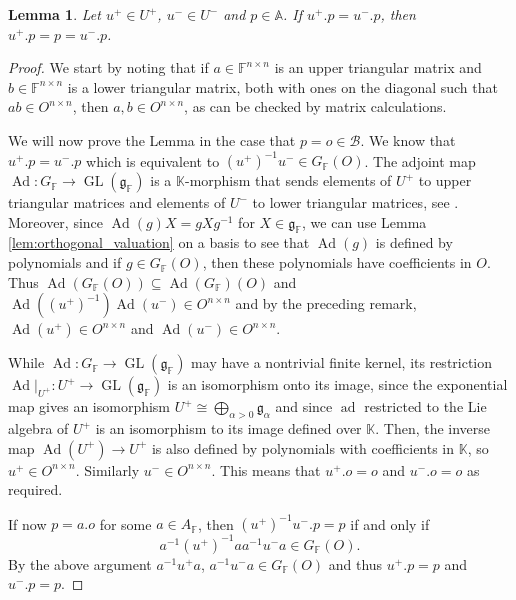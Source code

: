 \documentclass[12pt]{amsart}
\newcommand{\F}{\mathbb{F} }
\newcommand{\K}{\mathbb{K}}
\newcommand{\frakg}{\mathfrak{g}}
\newcommand{\A}{\mathbb{A}}
\newcommand{\B}{\mathcal{B}}
\numberwithin{equation}{section}
\newtheorem{lemma}[theorem]{Lemma}
\theoremstyle{remark} %
\begin{document}
		\begin{lemma}\label{lem:U+U-fix_U+fix}
			Let $u^+ \in U^+$, $u^- \in U^-$ and $p\in \A$. If $u^+.p = u^-.p$, then $u^+.p = p = u^-.p$.
		\end{lemma}
		\begin{proof}
			We start by noting that if $a \in \F^{n\times n}$ is an upper triangular matrix and $b \in \F^{n\times n}$ is a lower triangular matrix, both with ones on the diagonal such that $ab \in O^{n\times n}$, then $a, b \in O^{n\times n}$, as can be checked by matrix calculations. 
			
			We will now prove the Lemma in the case that $p = o \in \B$. We know that $u^+.p = u^-.p$ which is equivalent to $(u^+)^{-1}u^- \in G_\F(O)$. The adjoint map $\operatorname{Ad} \colon G_\F \to \operatorname{GL}(\frakg_\F)$ is a $\K$-morphism that sends elements of $U^+$ to upper triangular matrices and elements of $U^-$ to lower triangular matrices, see \cite[Lemma \ref{I-lem:kan_form}]{AppAGRCF}. Moreover, since $\operatorname{Ad}(g)X = gXg^{-1}$ for $X \in \frakg_\F$, we can use Lemma \ref{lem:orthogonal_valuation} on a basis to see that $\operatorname{Ad}(g)$ is defined by polynomials and if $g \in G_\F(O)$, then these polynomials have coefficients in $O$. %
			Thus $\operatorname{Ad}(G_\F(O)) \subseteq \operatorname{Ad}(G_\F)(O)$ and $\operatorname{Ad}((u^+)^{-1})\operatorname{Ad}(u^-) \in O^{n\times n}$ and by the preceding remark, $\operatorname{Ad}(u^+) \in O^{n\times n}$ and $\operatorname{Ad}(u^-) \in O^{n\times n}$.
			
			While $\operatorname{Ad} \colon G_\F \to \operatorname{GL}(\frakg_\F)$ may have a nontrivial finite kernel, its restriction $\operatorname{Ad}|_{U^+} \colon U^+ \to \operatorname{GL}(\frakg_\F) $ is an isomorphism onto its image, since the exponential map gives an isomorphism $U^+ \cong \bigoplus_{\alpha>0} \frakg_\alpha$ and since $\operatorname{ad}$ restricted to the Lie algebra of $U^+$ is an isomorphism to its image defined over $\K$. Then, the inverse map $\operatorname{Ad}(U^+) \to U^+$ is also defined by polynomials with coefficients in $\K$, so $u^+ \in O^{n\times n}$. Similarly $u^- \in O^{n\times n}$. This means that $u^+.o = o$ and $u^-.o = o$ as required.
			
			If now $p = a.o$ for some $a \in A_\F$, then $(u^+)^{-1}u^-.p = p$ if and only if $$a^{-1}(u^+)^{-1}aa^{-1}u^- a \in G_\F(O).$$
			By the above argument $a^{-1}u^+ a$, $a^{-1}u^-a \in G_\F(O)$ and thus $u^+.p = p$ and $u^-.p = p$.
		\end{proof}
		
\end{document}

